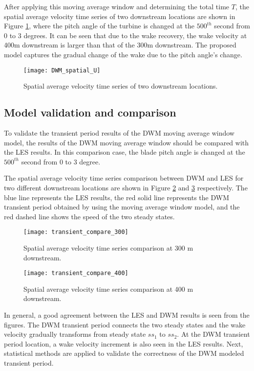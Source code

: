 \documentclass{umthesis}
\begin{document}
After applying this moving average window and determining the total time $T$, the spatial average velocity time series of two downstream locations are shown in Figure \ref{fig:DWM_spatial_U}, where the pitch angle of the turbine is changed at the $500^{th}$ second from 0 to 3 degrees. It can be seen that due to the wake recovery, the wake velocity at 400m downstream is larger than that of the 300m downstream. The proposed model captures the gradual change of the wake due to the pitch angle's change.

\begin{figure}
  \centering
  \texttt{[image: DWM\_spatial\_U]}
  \caption{Spatial average velocity time series of two downstream locations.}\label{fig:DWM_spatial_U}
\end{figure}

\subsection{Model validation and comparison}

To validate the transient period results of the DWM moving average window model, the results of the DWM moving average window should be compared with the LES results. In this comparison case, the blade pitch angle is changed at the $500^{th}$ second from 0 to 3 degree.  

The spatial average velocity time series comparison between DWM and LES for two different downstream locations are shown in Figure \ref{fig:transient_compare_300} and \ref{fig:transient_compare_400} respectively. The blue line represents the LES results, the red solid line represents the DWM transient period obtained by using the moving average window model, and the red dashed line shows the speed of the two steady states.
 
\begin{figure}
  \centering
  \texttt{[image: transient\_compare\_300]}
  \caption{Spatial average velocity time series comparison at 300 m downstream.}\label{fig:transient_compare_300}
\end{figure}

\begin{figure}
  \centering
  \texttt{[image: transient\_compare\_400]}
  \caption{Spatial average velocity time series comparison at 400 m downstream.}\label{fig:transient_compare_400}
\end{figure}

In general, a good agreement between the LES and DWM results is seen from the figures. The DWM transient period connects the two steady states and the wake velocity gradually transforms from steady state $ss_1$ to $ss_2$. At the DWM transient period location, a wake velocity increment is also seen in the LES results. Next, statistical methods are applied to validate the correctness of the DWM modeled transient period.
\end{document}
